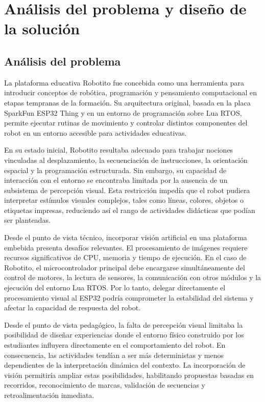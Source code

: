 \documentclass{prgrado}
\begin{document}

\chapter{Análisis del problema y diseño de la solución}

\section{Análisis del problema}

La plataforma educativa Robotito fue concebida como una herramienta para introducir conceptos de robótica, programación y pensamiento computacional en etapas tempranas de la formación. Su arquitectura original, basada en la placa SparkFun ESP32 Thing y en un entorno de programación sobre Lua RTOS, permite ejecutar rutinas de movimiento y controlar distintos componentes del robot en un entorno accesible para actividades educativas.

En su estado inicial, Robotito resultaba adecuado para trabajar nociones vinculadas al desplazamiento, la secuenciación de instrucciones, la orientación espacial y la programación estructurada. Sin embargo, su capacidad de interacción con el entorno se encontraba limitada por la ausencia de un subsistema de percepción visual. Esta restricción impedía que el robot pudiera interpretar estímulos visuales complejos, tales como líneas, colores, objetos o etiquetas impresas, reduciendo así el rango de actividades didácticas que podían ser planteadas.

Desde el punto de vista técnico, incorporar visión artificial en una plataforma embebida presenta desafíos relevantes. El procesamiento de imágenes requiere recursos significativos de CPU, memoria y tiempo de ejecución. En el caso de Robotito, el microcontrolador principal debe encargarse simultáneamente del control de motores, la lectura de sensores, la comunicación con otros módulos y la ejecución del entorno Lua RTOS. Por lo tanto, delegar directamente el procesamiento visual al ESP32 podría comprometer la estabilidad del sistema y afectar la capacidad de respuesta del robot.

Desde el punto de vista pedagógico, la falta de percepción visual limitaba la posibilidad de diseñar experiencias donde el entorno físico construido por los estudiantes influyera directamente en el comportamiento del robot. En consecuencia, las actividades tendían a ser más deterministas y menos dependientes de la interpretación dinámica del contexto. La incorporación de visión permitiría ampliar estas posibilidades, habilitando propuestas basadas en recorridos, reconocimiento de marcas, validación de secuencias y retroalimentación inmediata.
\end{document}
